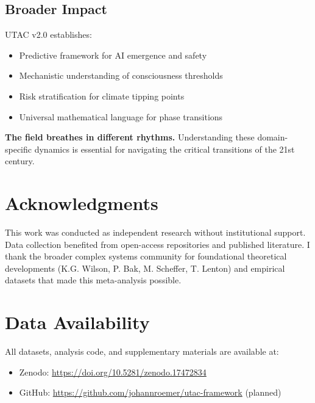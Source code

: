 \documentclass[11pt,a4paper]{article}
\begin{document}
\subsection{Broader Impact}

UTAC v2.0 establishes:
\begin{itemize}
\item Predictive framework for AI emergence and safety
\item Mechanistic understanding of consciousness thresholds
\item Risk stratification for climate tipping points
\item Universal mathematical language for phase transitions
\end{itemize}

\textbf{The field breathes in different rhythms.} Understanding these domain-specific dynamics is essential for navigating the critical transitions of the 21st century.

\section*{Acknowledgments}

This work was conducted as independent research without institutional support. Data collection benefited from open-access repositories and published literature. I thank the broader complex systems community for foundational theoretical developments (K.G. Wilson, P. Bak, M. Scheffer, T. Lenton) and empirical datasets that made this meta-analysis possible.

\section*{Data Availability}

All datasets, analysis code, and supplementary materials are available at:
\begin{itemize}
\item Zenodo: \url{https://doi.org/10.5281/zenodo.17472834}
\item GitHub: \url{https://github.com/johannroemer/utac-framework} (planned)
\end{itemize}
\end{document}
